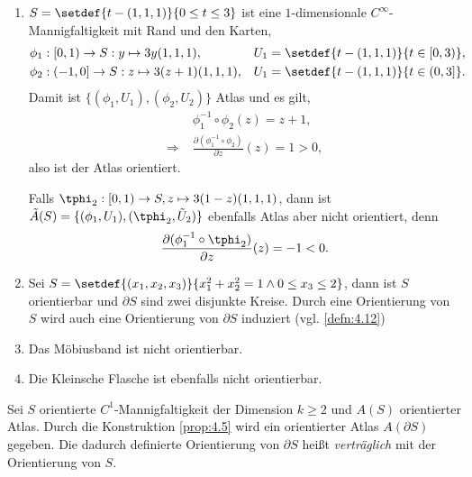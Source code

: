 \begin{bsp}
\label{bsp:4.11}
\begin{enumerate}[label=\arabic{*}.)]
  \item $S=\setdef{t-(1,1,1)}{0\le t\le 3}$ ist eine 
$1$-dimensionale $C^\infty$-Mannigfaltigkeit mit Rand und den Karten,
\begin{align*}
&\phi_1: [0,1)\to S: y\mapsto 3y (1,1,1), && U_1 = \setdef{t-(1,1,1)}{t\in
[0,3)},\\
&\phi_2: (-1,0]\to S: z\mapsto 3(z+1) (1,1,1), && U_1 = \setdef{t-(1,1,1)}{t\in
(0,3]}.
\end{align*}
Damit ist $\{(\phi_1,U_1), (\phi_2,U_2)\}$ Atlas und es gilt,
\begin{align*}
&\phi_1^{-1}\circ\phi_2(z) = z+1,\\
\Rightarrow\;& \frac{\partial (\phi_1^{-1}\circ\phi_2)}{\partial z}(z) = 1 > 0,
\end{align*}
also ist der Atlas orientiert.

Falls $\tphi_2: [0,1) \to S, z\mapsto 3(1-z)(1,1,1)$, dann ist
$\tilde{A}(S) = \{(\phi_1,U_1), (\tphi_2,\tilde{U}_2)\}$ ebenfalls Atlas aber
nicht orientiert, denn
\begin{align*}
\frac{\partial (\phi_1^{-1}\circ\tphi_2)}{\partial z}(z) = -1 < 0.
\end{align*}
\item Sei $S=\setdef{(x_1,x_2,x_3)}{x_1^2+x_2^2 = 1 \land 0\le x_3\le 2}$,
dann ist $S$ orientierbar und $\partial S$ sind zwei disjunkte Kreise. Durch
eine Orientierung von $S$ wird auch eine Orientierung von $\partial S$
induziert (vgl. \ref{defn:4.12})
\item Das Möbiusband ist nicht orientierbar.
\item Die Kleinsche Flasche ist ebenfalls nicht orientierbar.
\hfill\bsphere
\end{enumerate}
\end{bsp}

\begin{defn}
\label{defn:4.12}
Sei $S$ orientierte $C^1$-Mannigfaltigkeit der Dimension $k\ge 2$ und $A(S)$
orientierter Atlas. Durch die Konstruktion \ref{prop:4.5} wird ein orientierter
Atlas $A(\partial S)$ gegeben. Die dadurch definierte Orientierung von $\partial
S$ heißt \emph{verträglich} mit der Orientierung von $S$.\fishhere
\end{defn}

